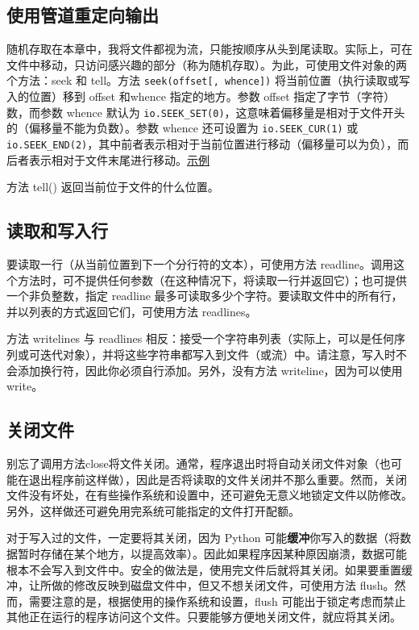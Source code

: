 \subsection{使用管道重定向输出}
\begin{tcolorbox}[title=随机存取]
    随机存取在本章中，我将文件都视为流，只能按顺序从头到尾读取。实际上，可在文件中移动，只访问感兴趣的部分（称为随机存取）。为此，可使用文件对象的两个方法：seek 和 tell。方法 \verb|seek(offset[, whence])| 将当前位置（执行读取或写入的位置）移到 offset 和whence 指定的地方。参数 offset 指定了字节（字符）数，而参数 whence 默认为 \verb|io.SEEK_SET(0)|，这意味着偏移量是相对于文件开头的（偏移量不能为负数）。参数 whence 还可设置为 \verb|io.SEEK_CUR(1)| 或 \verb|io.SEEK_END(2)|，其中前者表示相对于当前位置进行移动（偏移量可以为负），而后者表示相对于文件末尾进行移动。\href{random_access}{示例}

    方法 tell() 返回当前位于文件的什么位置。
\end{tcolorbox}
\subsection{读取和写入行}
要读取一行（从当前位置到下一个分行符的文本），可使用方法 readline。调用这个方法时，可不提供任何参数（在这种情况下，将读取一行并返回它）；也可提供一个非负整数，指定 readline 最多可读取多少个字符。要读取文件中的所有行，并以列表的方式返回它们，可使用方法 readlines。

方法 writelines 与 readlines 相反：接受一个字符串列表（实际上，可以是任何序列或可迭代对象），并将这些字符串都写入到文件（或流）中。请注意，写入时不会添加换行符，因此你必须自行添加。另外，没有方法 writeline，因为可以使用 write。

\subsection{关闭文件}
别忘了调用方法close将文件关闭。通常，程序退出时将自动关闭文件对象（也可能在退出程序前这样做），因此是否将读取的文件关闭并不那么重要。然而，关闭文件没有坏处，在有些操作系统和设置中，还可避免无意义地锁定文件以防修改。另外，这样做还可避免用完系统可能指定的文件打开配额。

对于写入过的文件，一定要将其关闭，因为 Python 可能\textbf{缓冲}你写入的数据（将数据暂时存储在某个地方，以提高效率）。因此如果程序因某种原因崩溃，数据可能根本不会写入到文件中。安全的做法是，使用完文件后就将其关闭。如果要重置缓冲，让所做的修改反映到磁盘文件中，但又不想关闭文件，可使用方法 flush。然而，需要注意的是，根据使用的操作系统和设置，flush 可能出于锁定考虑而禁止其他正在运行的程序访问这个文件。只要能够方便地关闭文件，就应将其关闭。

